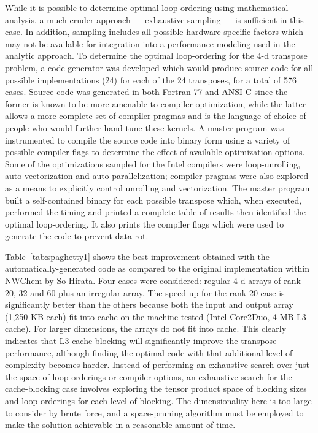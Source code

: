 \documentclass[letterpaper,12pt]{article}
\begin{document}
While it is possible to determine optimal loop ordering using mathematical analysis, a much cruder approach --- exhaustive sampling --- is sufficient in this case.  In addition, sampling includes all possible hardware-specific factors which may not be available for integration into a performance modeling used in the analytic approach.  To determine the optimal loop-ordering for the $4$-d transpose problem, a code-generator was developed which would produce source code for all possible implementations (24) for each of the 24 transposes, for a total of 576 cases.  Source code was generated in both Fortran 77 and ANSI C since the former is known to be more amenable to compiler optimization, while the latter allows a more complete set of compiler pragmas and is the language of choice of people who would further hand-tune these kernels.  A master program was instrumented to compile the source code into binary form using a variety of possible compiler flags to determine the effect of available optimization options.  Some of the optimizations sampled for the Intel compilers were loop-unrolling, auto-vectorization and auto-parallelization; compiler pragmas were also explored as a means to explicitly control unrolling and vectorization.  The master program built a self-contained binary for each possible transpose which, when executed, performed the timing and printed a complete table of results then identified the optimal loop-ordering.  It also prints the compiler flags which were used to generate the code to prevent data rot.

Table~\ref{tab:spaghetty1} shows the best improvement obtained with the automatically-generated code as compared to the original implementation within NWChem by So Hirata.  Four cases were considered: regular $4$-d arrays of rank 20, 32 and 60 plus an irregular array.  The speed-up for the rank 20 case is significantly better than the others because both the input and output array (1,250 KB each) fit into cache on the machine tested (Intel Core2Duo, 4 MB L3 cache).  For larger dimensions, the arrays do not fit into cache.  This clearly indicates that L3 cache-blocking will significantly improve the transpose performance, although finding the optimal code with that additional level of complexity becomes harder.  Instead of performing an exhaustive search over just the space of loop-orderings or compiler options, an exhaustive search for the cache-blocking case involves exploring the tensor product space of blocking sizes and loop-orderings for each level of blocking.  The dimensionality here is too large to consider by brute force, and a space-pruning algorithm must be employed to make the solution achievable in a reasonable amount of time.
\end{document}

